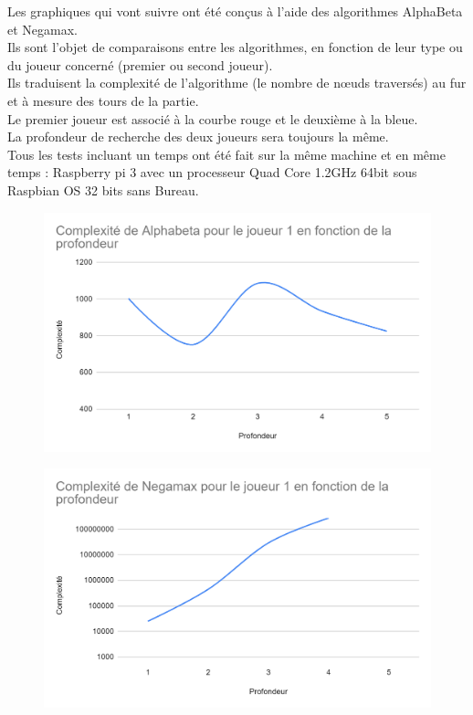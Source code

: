 \documentclass[12pt]{article}
\begin{document}
Les graphiques qui vont suivre ont été conçus à l’aide des algorithmes AlphaBeta et Negamax.\\
Ils sont l’objet de comparaisons entre les algorithmes, en fonction de leur type ou du joueur concerné (premier ou second joueur).\\
Ils traduisent la complexité de l’algorithme (le nombre de nœuds traversés) au fur et à mesure des tours de la partie.\\
Le premier joueur est associé à la courbe rouge et le deuxième à la bleue.\\
La profondeur de recherche des deux joueurs sera toujours la même.\\

Tous les tests incluant un temps ont été fait sur la même machine et en même temps : Raspberry pi 3 avec un processeur Quad Core 1.2GHz 64bit sous Raspbian OS 32 bits sans Bureau.
\newpage

\begin{figure}[!h]
   \includegraphics[width=\textwidth]{alphabeta.png}
\end{figure}

\begin{figure}[!h]
   \includegraphics[width=\textwidth]{negamax.png}
\end{figure}
\end{document}
